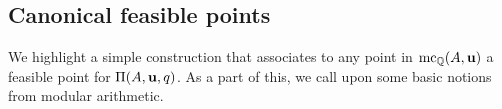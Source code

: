 \documentclass[11pt]{amsart}
\begin{document}




\subsection{Canonical feasible points}  We highlight a simple construction that associates to any point in $\operatorname{mc}_{\mathbb{Q}}(A, \mathbf{u})$ a feasible point for $\Pi(A, \mathbf{u}, q)$.  As a part of this, we call upon some basic notions from modular arithmetic.   
\end{document}
